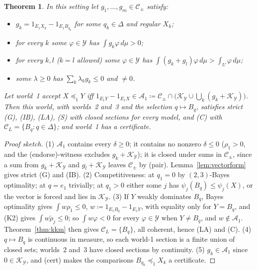 \documentclass[11pt]{article}
\newtheorem{theorem}{Theorem}[section]
\theoremstyle{definition}
\theoremstyle{remark}
\newcommand{\C}{\mathcal C}
\begin{document}
\begin{theorem}\label{thm:K25}
In this setting let $g_1,\dots,g_m\in\mathcal C_\pm$ satisfy:
\begin{itemize}[leftmargin=*]
\item[\textbf{(fit)}] $g_k=1_{E_1X_k}-1_{E_1B_{q_k}}$ for some $q_k\in\Delta$ and regular $X_k$;
\item[\textbf{(endorse)}] for every $k$ some $\varphi\in\mathcal Y$ has $\int g_k\varphi\,d\mu>0$;
\item[\textbf{(pair)}] for every $k,l$ ($k=l$ allowed) some $\varphi\in\mathcal Y$ has $\int(g_k+g_l)\varphi\,d\mu>\int_U\varphi\,d\mu$;
\item[\textbf{(cert)}] some $\lambda\ge0$ has $\sum_k\lambda_kg_k\le0$ and $\ne0$.
\end{itemize}
Let world~1 accept $X\preceq_1Y$ iff $1_{E_1Y}-1_{E_1X}\in\mathcal A_1\coloneqq\mathcal C_\pm\cap\bigl(\mathcal K_{\mathcal Y}\cup\bigcup_k(g_k+\mathcal K_{\mathcal Y})\bigr)$. Then this world, with worlds~2 and~3 and the selection $q\mapsto B_q$, satisfies strict (G), (IB), (LA), (S) with closed sections for every model, and (C) with $\C_L=\{B_q:q\in\Delta\}$; and world~1 has a certificate.
\end{theorem}
\begin{proof}[Proof sketch]
(1) $\mathcal A_1$ contains every $\delta\ge0$; it contains no nonzero $\delta\le0$ ($\rho_1>0$, and the (endorse)-witness excludes $g_k+\mathcal K_{\mathcal Y}$); it is closed under sums in $\mathcal C_\pm$, since a sum from $g_k+\mathcal K_{\mathcal Y}$ and $g_l+\mathcal K_{\mathcal Y}$ leaves $\mathcal C_\pm$ by (pair). Lemma~\ref{lem:vectorform} gives strict (G) and (IB). (2) Competitiveness: at $q_1=0$ by $(2,3)$-Bayes optimality; at $q=e_1$ trivially; at $q_1>0$ either some $j$ has $\psi_j(B_q)\le\psi_j(X)$, or the vector is forced and lies in $\mathcal K_{\mathcal Y}$. (3) If $Y$ weakly dominates $B_q$, Bayes optimality gives $\int w\rho_1\le0$, $w\coloneqq1_{E_1B_q}-1_{E_1Y}$, with equality only for $Y=B_q$, and (K2) gives $\int w\tilde\rho_j\le0$; so $\int w\varphi<0$ for every $\varphi\in\mathcal Y$ when $Y\ne B_q$, and $w\notin\mathcal A_1$. Theorem~\ref{thm:kkm} then gives $\C_L=\{B_q\}$, all coherent, hence (LA) and (C). (4) $q\mapsto B_q$ is continuous in measure, so each world-1 section is a finite union of closed sets; worlds~2 and~3 have closed sections by continuity. (5) $g_k\in\mathcal A_1$ since $0\in\mathcal K_{\mathcal Y}$, and (cert) makes the comparisons $B_{q_k}\preceq_1X_k$ a certificate.
\end{proof}
\end{document}
